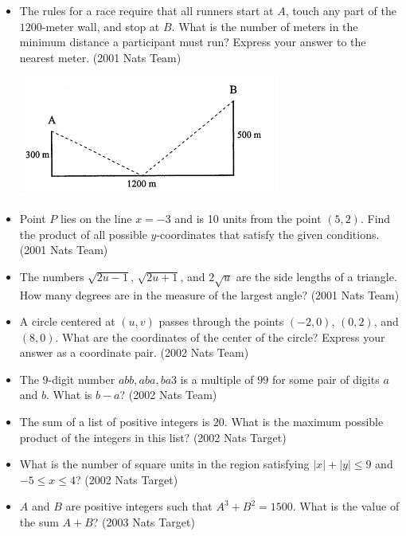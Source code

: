 \documentclass{article}
\begin{document}
\begin{itemize}
\begin{itemize}
\item The rules for a race require that all runners start at $A$, touch any part of the $1200$-meter wall, and stop at $B$. What is the number of meters in the minimum distance a participant must run? Express your answer to the nearest meter. (2001 Nats Team)

\centerline{\includegraphics{2001Team.png}}

\item Point $P$ lies on the line $x=-3$ and is 10 units from the point $(5,2)$. Find the product of all possible $y$-coordinates that satisfy the given conditions. (2001 Nats Team)

\item The numbers $\sqrt{2u-1}$, $\sqrt{2u+1}$, and $2\sqrt{u}$ are the side lengths of a triangle. How many degrees are in the measure of the largest angle? (2001 Nats Team)

\item A circle centered at $(u,v)$ passes through the points $(-2,0)$, $(0,2)$, and $(8,0)$. What are the coordinates of the center of the circle? Express your answer as a coordinate pair. (2002 Nats Team)

\item The 9-digit number $abb,aba,ba3$ is a multiple of $99$ for some pair of digits $a$ and $b$. What is $b-a$? (2002 Nats Team)

\item The sum of a list of positive integers is $20$. What is the maximum possible product of the integers in this list? (2002 Nats Target)

\item What is the number of square units in the region satisfying $|x|+|y|\le 9$ and $-5\le x\le 4$? (2002 Nats Target)

\item $A$ and $B$ are positive integers such that $A^3+B^2=1500$. What is the value of the sum $A+B$? (2003 Nats Target)

\end{itemize}

\end{itemize}
\end{document}
